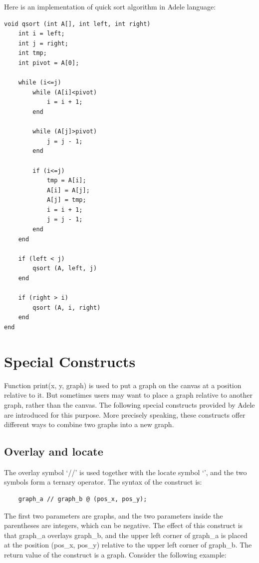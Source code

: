 \documentclass[11pt,letterpaper]{article}
\begin{document}
Here is an implementation of quick sort algorithm in Adele language:

\begin{lstlisting}[caption=qsort.adl, label=qsort, captionpos=b, frame=single, tabsize=4]
void qsort (int A[], int left, int right)
	int i = left;
	int j = right;
	int tmp;
	int pivot = A[0];

	while (i<=j)
		while (A[i]<pivot)
			i = i + 1;
		end
  		
		while (A[j]>pivot)
			j = j - 1;
		end
  		
  		if (i<=j)
			tmp = A[i];
			A[i] = A[j];
			A[j] = tmp;
			i = i + 1;
			j = j - 1;
		end
	end

	if (left < j)
  		qsort (A, left, j)
	end

	if (right > i)
  		qsort (A, i, right)
	end
end
\end{lstlisting}


\section {Special Constructs}

Function print(x, y, graph) is used to put a graph on the canvas at a position relative to it. But sometimes users may want to place a graph relative to another graph, rather than the canvas. The following special constructs provided by Adele are introduced for this purpose. More precisely speaking, these constructs offer different ways to combine two graphs into a new graph.

\subsection {Overlay and locate}

The overlay symbol ‘//’ is used together with the locate symbol ‘\@’, and the two symbols form a ternary operator. The syntax of the construct is:

\begin{lstlisting}
    graph_a // graph_b @ (pos_x, pos_y);
\end{lstlisting}

The first two parameters are graphs, and the two parameters inside the parentheses are integers, which can be negative. The effect of this construct is that graph\_a overlays graph\_b, and the upper left corner of graph\_a is placed at the position (pos\_x, pos\_y) relative to the upper left corner of graph\_b. The return value of the construct is a graph. Consider the following example:
\end{document}
